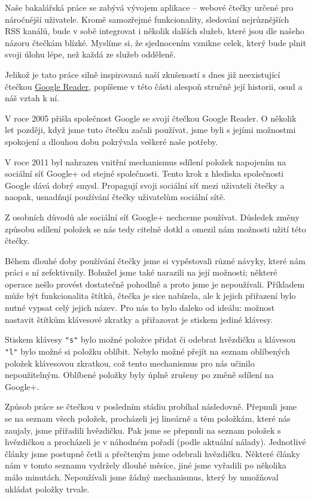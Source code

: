
Naše bakalářská práce se zabývá vývojem aplikace -- webové čtečky určené pro náročnější uživatele.
Kromě samozřejmé funkcionality, sledování nejrůznějších RSS kanálů, bude v sobě integrovat i několik dalších služeb, které jsou dle našeho názoru čtečkám blízké.
Myslíme si, že sjednocením vznikne celek, který bude plnit svoji úlohu lépe, než každá ze služeb odděleně.


Jelikož je tato práce silně inspirovaná naší zkušeností s dnes již neexistující čtečkou \href{http://www.google.com/reader/about/}{Google Reader}, popíšeme v této části alespoň stručně její historii, osud a náš vztah k ní.


V roce 2005 přišla společnost Google se svojí čtečkou Google Reader.
O několik let později, když jsme tuto čtečku začali používat, jsme byli s jejími možnostmi spokojení a dlouhou dobu pokrývala veškeré naše potřeby.

V roce 2011 byl nahrazen vnitřní mechanismus sdílení položek napojením na sociální síť Google+ od stejné společnosti.
Tento krok z hlediska společnosti Google dává dobrý smysl.
Propagují svoji sociální síť mezi uživateli čtečky a naopak, usnadňují používání čtečky uživatelům sociální sítě.

Z osobních důvodů ale sociální síť Google+ nechceme používat.
Důsledek změny způsobu sdílení položek se nás tedy citelně dotkl a omezil nám možnosti užití této čtečky.

Během dlouhé doby používání čtečky jsme si vypěstovali různé návyky, které nám práci s ní zefektivnily.
Bohužel jsme také narazili na její možnosti; některé operace nešlo provést dostatečně pohodlně a proto jsme je nepoužívali.
Příkladem může být funkcionalita štítků, čtečka je sice nabízela, ale k jejich přiřazení bylo nutné vypsat celý jejich název.
Pro nás to bylo daleko od ideálu: možnost nastavit štítkům klávesové zkratky a přiřazovat je stiskem jediné klávesy.

Stiskem klávesy \verb|"s"| bylo možné položce přidat či odebrat hvězdičku a klávesou \verb|"l"| bylo možné si položku oblíbit.
Nebylo možné přejít na seznam oblíbených položek klávesovou zkratkou, což tento mechanismus pro nás učinilo nepoužitelným.
Oblíbené položky byly úplně zrušeny po změně sdílení na Google+.

Způsob práce se čtečkou v posledním stádiu probíhal následovně.
Přepnuli jsme se na seznam všech položek, procházeli jej lineárně a těm položkám, které nás zaujaly, jsme přiřadili hvězdičku.
Pak jsme se přepnuli na seznam položek s hvězdičkou a procházeli je v náhodném pořadí (podle aktuální nálady).
Jednotlivé články jsme postupně četli a přečteným jsme odebrali hvězdičku.
Některé články nám v tomto seznamu vydržely dlouhé měsíce, jiné jsme vyřadili po několika málo minutách.
Nepoužívali jsme žádný mechanismus, který by umožňoval ukládat položky trvale.

